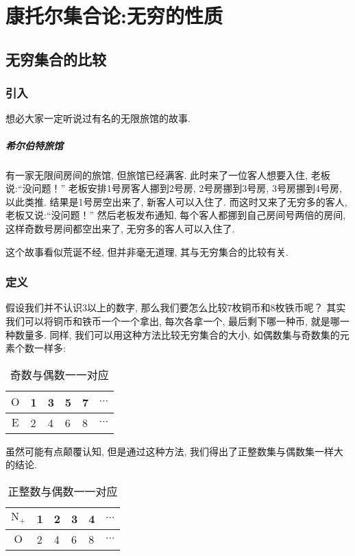 \chapter{康托尔集合论:无穷的性质}

\section{无穷集合的比较}
\subsection{引入}
想必大家一定听说过有名的无限旅馆的故事.

\paragraph{希尔伯特旅馆}
有一家无限间房间的旅馆, 但旅馆已经满客.
此时来了一位客人想要入住, 老板说:“没问题！”
老板安排1号房客人挪到2号房, 2号房挪到3号房, 3号房挪到4号房, 以此类推.
结果是1号房空出来了, 新客人可以入住了.
而这时又来了无穷多的客人, 老板又说:“没问题！”
然后老板发布通知, 每个客人都挪到自己房间号两倍的房间, 这样奇数号房间都空出来了, 无穷多的客人可以入住了.

这个故事看似荒诞不经, 但并非毫无道理, 其与无穷集合的比较有关.

\subsection{定义}
\label{defi}
假设我们并不认识$3$以上的数字, 那么我们要怎么比较$7$枚铜币和$8$枚铁币呢？
其实我们可以将铜币和铁币一个一个拿出, 每次各拿一个, 最后剩下哪一种币, 就是哪一种数量多.
同样, 我们可以用这种方法比较无穷集合的大小, 如偶数集与奇数集的元素个数一样多:
\begin{table}[!ht]
  \begin{center}
    \begin{tabular}{c|lllll}
      \toprule
      $\mathrm O$ & 1 & 3 & 5 & 7 & $\cdots$ \\
      \midrule
      $\mathrm E$ & 2 & 4 & 6 & 8 & $\cdots$ \\
      \bottomrule
    \end{tabular}
    \caption{奇数与偶数一一对应}
  \end{center}
\end{table}

虽然可能有点颠覆认知, 但是通过这种方法, 我们得出了正整数集与偶数集一样大的结论.

\begin{table}[!h]
  \begin{center}
    \begin{tabular}{c|lllll}
      \toprule
      $\mathrm N_+$ & 1 & 2 & 3 & 4 & $\cdots$ \\
      \midrule
      $\mathrm O$   & 2 & 4 & 6 & 8 & $\cdots$ \\
      \bottomrule
    \end{tabular}
    \caption{正整数与偶数一一对应}
  \end{center}
\end{table}

